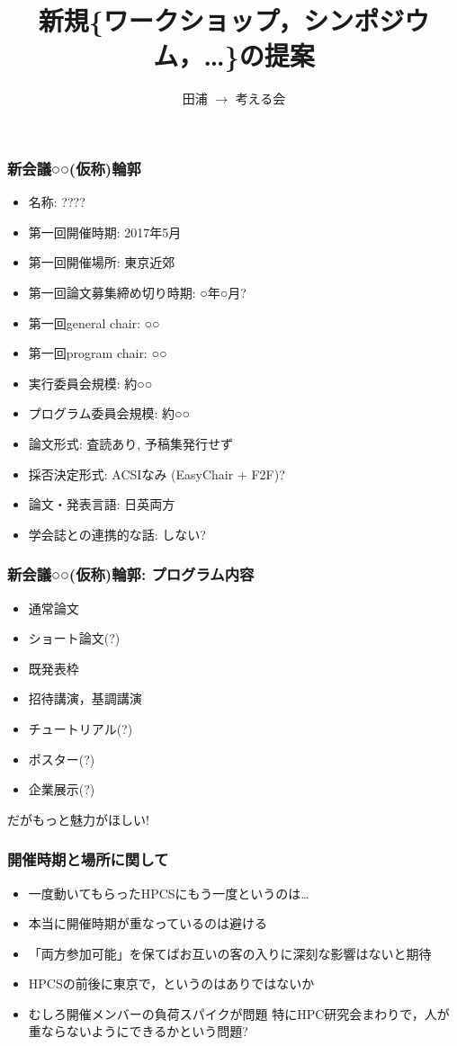\documentclass[12pt,dvipdfmx]{beamer}
\title{新規\{ワークショップ，シンポジウム，\ldots\}\confname の提案}
\institute{}
\author{田浦 $\rightarrow$ 考える会}
\date{}
\newcommand{\confname}{{○○(仮称)}}
\newcommand{\firstconfdate}{\ao{2017年5月}}
\newcommand{\firstconfplace}{\ao{東京近郊}}
\newcommand{\firstdeadline}{\ao{○年○月}}
\newcommand{\firstgeneralchair}{\ao{○○}}
\newcommand{\firstprogramchair}{\ao{○○}}
\newcommand{\sizeoc}{\ao{○○}}
\newcommand{\sizepc}{\ao{○○}}
\newcommand{\ao}[1]{{\color{blue}#1}}
\begin{document}
\maketitle

\begin{frame}
\frametitle{新会議\confname 輪郭}
\begin{itemize}
\item 名称: ????
\item 第一回開催時期: \firstconfdate 
\item 第一回開催場所: \firstconfplace
\item 第一回論文募集締め切り時期: \firstdeadline ?
\item 第一回general chair: \firstgeneralchair
\item 第一回program chair: \firstprogramchair
\item 実行委員会規模: 約\sizeoc
\item プログラム委員会規模: 約\sizepc
\item 論文形式: \ao{査読あり, 予稿集発行せず}
\item 採否決定形式: \ao{ACSIなみ (EasyChair + F2F)?}
\item 論文・発表言語: \ao{日英両方}
\item 学会誌との連携的な話: \ao{しない?}
\end{itemize}
\end{frame}

\begin{frame}
\frametitle{新会議\confname 輪郭: プログラム内容}
\begin{itemize}
\item 通常論文
\item ショート論文(?)
\item 既発表枠
\item 招待講演，基調講演
\item チュートリアル(?)
\item ポスター(?)
\item 企業展示(?)
\end{itemize}

\begin{center}
\ao{\huge だがもっと魅力がほしい!}
\end{center}

\end{frame}

\begin{frame}
\frametitle{開催時期と場所に関して}

\begin{itemize}
\item 一度動いてもらったHPCSにもう一度というのは\ldots
\item 本当に開催時期が重なっているのは避ける
\item 「両方参加可能」を保てばお互いの客の入りに深刻な影響はないと期待
\item HPCSの前後に東京で，というのはありではないか
\item むしろ開催メンバーの負荷スパイクが問題
  特にHPC研究会まわりで，人が重ならないようにできるかという問題?
\end{itemize}
\end{frame}
\end{document}
